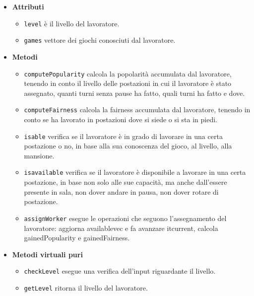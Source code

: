 \begin{itemize}
    \item \textbf{Attributi}
    \begin{itemize}
        \item \texttt{level} è il livello del lavoratore.
        \item \texttt{games} vettore dei giochi conosciuti dal lavoratore.
    \end{itemize}
    \item \textbf{Metodi}
    \begin{itemize}
        \item \texttt{computePopularity} calcola la popolarità accumulata dal lavoratore, tenendo in conto il livello delle postazioni in cui il lavoratore è stato assegnato, quanti turni senza pause ha fatto, quali turni ha fatto e dove.
        \item \texttt{computeFairness} calcola la fairness accumulata dal lavoratore, tenendo in conto se ha lavorato in postazioni dove si siede o si sta in piedi.
        \item \texttt{is\textunderscore able} verifica se il lavoratore è in grado di lavorare in una certa postazione o no, in base alla sua conoscenza del gioco, al livello, alla mansione.
        \item \texttt{is\textunderscore available} verifica se il lavoratore è disponibile a lavorare in una certa postazione, in base non solo alle sue capacità, ma anche dall'essere presente in sala, non dover andare in pausa, non dover rotare di postazione.
        \item \texttt{assignWorker} esegue le operazioni che seguono l'assegnamento del lavoratore: aggiorna available\textunderscore vec e fa avanzare it\textunderscore current, calcola gainedPopularity e gainedFairness.
    \end{itemize}
    \item \textbf{Metodi virtuali puri}
    \begin{itemize}
        \item \texttt{checkLevel} esegue una verifica dell'input riguardante il livello.
        \item \texttt{getLevel} ritorna il livello del lavoratore.
    \end{itemize}
\end{itemize}


